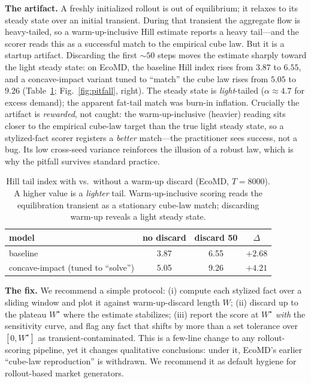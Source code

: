 \documentclass{article}
\begin{document}
\textbf{The artifact.} A freshly initialized rollout is out of equilibrium; it relaxes to its steady
state over an initial transient. During that transient the aggregate flow is heavy-tailed, so a
warm-up-inclusive Hill estimate reports a heavy tail---and the scorer reads this as a successful match
to the empirical cube law. But it is a startup artifact. Discarding the first $\sim\!50$ steps moves
the estimate sharply toward the light steady state: on EcoMD, the baseline Hill index rises from
$3.87$ to $6.55$, and a concave-impact variant tuned to ``match'' the cube law rises from $5.05$ to
$9.26$ (Table~\ref{tab:warmup}; Fig.~\ref{fig:pitfall}, right). The steady state is \emph{light}-tailed
($\alpha\!\approx\!4.7$ for excess demand); the apparent fat-tail match was burn-in inflation.
Crucially the artifact is \emph{rewarded}, not caught: the warm-up-inclusive (heavier) reading sits
closer to the empirical cube-law target than the true light steady state, so a stylized-fact scorer
registers a \emph{better} match---the practitioner sees success, not a bug. Its low cross-seed
variance reinforces the illusion of a robust law, which is why the pitfall survives standard practice.

\begin{table}[t]
\centering
\small
\caption{Hill tail index with vs.\ without a warm-up discard (EcoMD, $T\!=\!8000$). A higher value is
a \emph{lighter} tail. Warm-up-inclusive scoring reads the equilibration transient as a stationary
cube-law match; discarding warm-up reveals a light steady state.}
\label{tab:warmup}
\begin{tabular}{lccc}
\toprule
model & no discard & discard 50 & $\Delta$ \\
\midrule
baseline & 3.87 & 6.55 & $+2.68$ \\
concave-impact (tuned to ``solve'') & 5.05 & 9.26 & $+4.21$ \\
\bottomrule
\end{tabular}
\end{table}

\textbf{The fix.} We recommend a simple protocol: (i) compute each stylized fact over a sliding window
and plot it against warm-up-discard length $W$; (ii) discard up to the plateau $W^\star$ where the
estimate stabilizes; (iii) report the score at $W^\star$ \emph{with} the sensitivity curve, and flag
any fact that shifts by more than a set tolerance over $[0,W^\star]$ as transient-contaminated. This is
a few-line change to any rollout-scoring pipeline, yet it changes qualitative conclusions: under it,
EcoMD's earlier ``cube-law reproduction'' is withdrawn. We recommend it as default hygiene for
rollout-based market generators.
\end{document}
